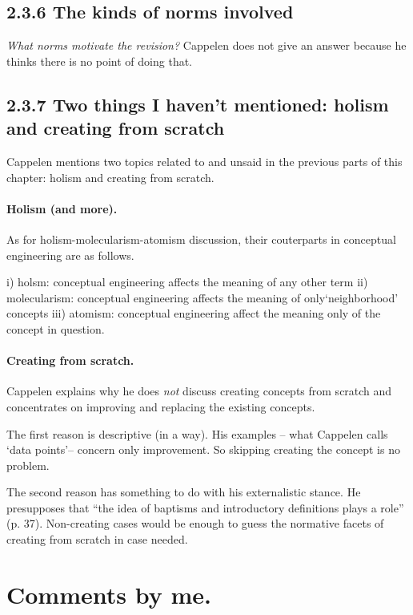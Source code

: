 \documentclass[
10pt, %
a4paper, %
twocolumn, %
landscape %
]{article}
\begin{document}
\subsection*{2.3.6 The kinds of norms involved}
\emph{What norms motivate the revision?}
Cappelen does not give an answer because he thinks there is no point of doing that.
\subsection*{2.3.7 Two things I haven't mentioned: holism and creating from scratch}
Cappelen mentions two topics related to and unsaid in the previous parts of this chapter: holism and creating from scratch.

\paragraph{Holism (and more).}
As for holism-molecularism-atomism discussion, their couterparts in conceptual engineering are as follows.

i) holsm: conceptual engineering affects the meaning of any other term
ii) molecularism: conceptual engineering affects the meaning of  only`neighborhood' concepts
iii) atomism: conceptual engineering affect the meaning only of the concept in question.

\paragraph{Creating from scratch.}
Cappelen explains why he does \emph{not} discuss creating concepts from scratch and concentrates on improving and replacing the existing concepts.

The first reason is descriptive (in a way). His examples -- what Cappelen calls `data points'-- concern only improvement.
So skipping creating the concept is no problem.

The second reason has something to do with his externalistic stance. He presupposes that ``the idea of baptisms and introductory definitions plays a role'' (p. 37). Non-creating cases would be enough to guess the normative facets of creating from scratch in case needed.

\section*{Comments by me.}



\end{document}
